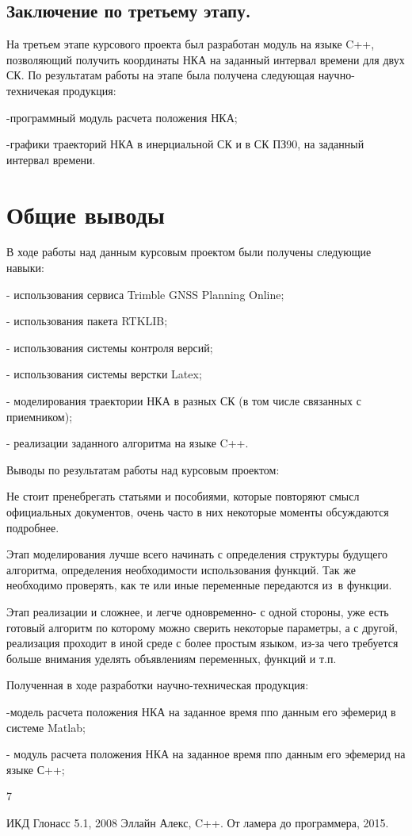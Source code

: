 \documentclass[]{article}
\begin{document}
\subsection{Заключение по третьему этапу.}

На третьем этапе курсового проекта был разработан модуль на языке C++, позволяющий получить координаты НКА на заданный интервал времени для двух СК.  По результатам работы на этапе была получена следующая научно-техничекая продукция:

-программный модуль расчета положения НКА;

-графики траекторий НКА в инерциальной СК и в СК ПЗ90, на заданный интервал времени.

\newpage
\section{Общие выводы}
В ходе работы над данным курсовым проектом были получены следующие навыки:

- использования сервиса Trimble GNSS Planning Online;

- использования пакета RTKLIB;

- использования системы контроля версий;

- использования системы верстки Latex;

- моделирования траектории НКА в разных СК (в том числе связанных с приемником);

- реализации заданного алгоритма на языке C++.

Выводы по результатам работы над курсовым проектом:

Не стоит пренебрегать статьями и пособиями, которые повторяют смысл официальных документов, очень часто в них некоторые моменты обсуждаются подробнее. 

Этап моделирования лучше всего начинать с определения структуры будущего алгоритма, определения необходимости использования функций. Так же необходимо проверять, как те или иные переменные передаются из\ в функции.

Этап реализации и сложнее, и легче одновременно- с одной стороны, уже есть готовый алгоритм по которому можно сверить некоторые параметры, а с другой, реализация проходит в иной среде с более простым языком, из-за чего требуется больше внимания уделять объявлениям переменных, функций и т.п.

Полученная в ходе разработки научно-техническая продукция:

-модель расчета положения НКА на заданное время ппо данным его эфемерид  в системе Matlab;

- модуль расчета положения НКА на заданное время ппо данным его эфемерид  на языке С++;

\newpage
{}
\begin{thebibliography} {7}
	
	 ИКД Глонасс 5.1, 2008
	 Эллайн Алекс, C++. От ламера до программера, 2015.
	
	
\end{thebibliography}
\end{document}
